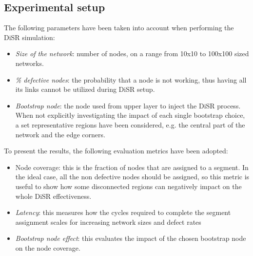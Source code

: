 \subsection{Experimental setup}
The following parameters have been taken into account when
performing the DiSR simulation:
\begin{itemize}
\item {\emph{Size of the network}}: number of nodes, on a range from
10x10 to 100x100 sized networks. 
\item {\emph{\% defective nodes}}: the probability that a node is not
working, thus having all its links cannot be utilized during DiSR setup.  
\item {\emph{Bootstrap node}}: the node used from upper layer 
to inject the DiSR process. When not explicitly investigating the
impact of each single bootstrap choice, a set representative regions have been
considered, e.g. the central part of the network and the edge corners.
\end{itemize}
To present the results, the following evaluation metrics have been adopted:
\begin{itemize}
\item{Node coverage}: this is the fraction of nodes that
are assigned to a segment. In the ideal case, all the non defective
nodes should be assigned, so this metric is useful to show how some
disconnected regions can negatively impact on the whole DiSR
effectiveness.
\item{\emph{Latency}}: this measures how the cycles required to complete the
segment assignment scales for increasing network sizes and defect rates
\item{\emph{Bootstrap node effect}}: this evaluates the impact of the chosen
bootstrap node on the node coverage.
\end{itemize}



